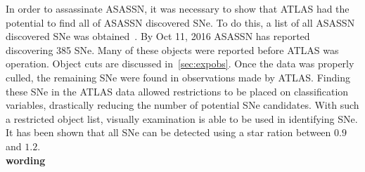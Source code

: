 \documentclass[aps,prb,twocolumn,superscriptaddress]{revtex4-1}
\begin{document}
\indent In order to assassinate ASASSN, 
it was necessary to show that ATLAS had the potential to find all of ASASSN discovered SNe. 
To do this, a list of all ASASSN discovered SNe was obtained~\cite{asn_data}. 
By Oct 11, 2016 
ASASSN has reported discovering 385 SNe. Many of these 
objects were reported before ATLAS was operation. Object cuts are discussed 
in~\cref{sec:expobs}. Once the data was properly culled, the remaining SNe 
were found in observations made by ATLAS. 
Finding these SNe in the ATLAS 
data allowed restrictions to be placed on classification variables, drastically 
reducing the number of potential SNe candidates. With such a restricted object 
list, visually examination is able to be used in identifying SNe.  It has been 
shown that all SNe can be detected using a star ration between $0.9$ and $1.2$.\\{\bf wording} 

\end{document}
